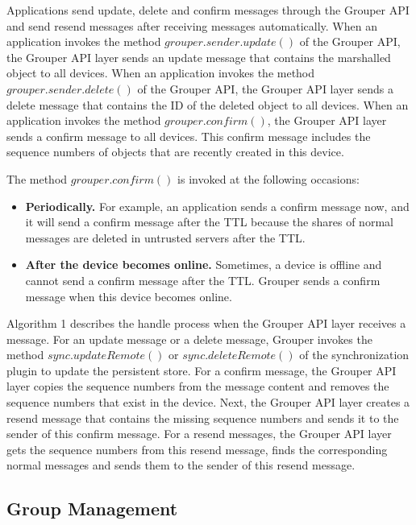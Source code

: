 \documentclass[twocolumn,10pt]{article}
\begin{document}
Applications send update, delete and confirm messages through the Grouper API and send resend messages after receiving messages automatically.
When an application invokes the method $grouper.sender.update()$ of the Grouper API, the Grouper API layer sends an update message that contains the marshalled object to all devices.
When an application invokes the method $grouper.sender.delete()$ of the Grouper API, the Grouper API layer sends a delete message that contains the ID of the deleted object to all devices. 
When an application invokes the method $grouper.confirm()$, the Grouper API layer sends a confirm message to all devices. 
This confirm message includes the sequence numbers of objects that are recently created in this device.

The method $grouper.confirm()$ is invoked at the following occasions:

\begin{itemize}
	\setlength{\itemsep}{1pt}
	\setlength{\parskip}{0pt}
	\setlength{\parsep}{0pt}
	\item \textbf{Periodically.}
	For example, an application sends a confirm message now, and it will send a confirm message after the TTL because the shares of normal messages are deleted in untrusted servers after the TTL.
	\item \textbf{After the device becomes online.} 
	Sometimes, a device is offline and cannot send a confirm message after the TTL.
	Grouper sends a confirm message when this device becomes online.
\end{itemize}

Algorithm 1 describes the handle process when the Grouper API layer receives a message.
For an update message or a delete message, Grouper invokes the method $sync.updateRemote()$ or $sync.deleteRemote()$ of the synchronization plugin to update the persistent store.
For a confirm message, the Grouper API layer copies the sequence numbers from the message content and removes the sequence numbers that exist in the device.
Next, the Grouper API layer creates a resend message that contains the missing sequence numbers and sends it to the sender of this confirm message.
For a resend messages, the Grouper API layer gets the sequence numbers from this resend message, finds the corresponding normal messages and sends them to the sender of this resend message.

\subsection{Group Management}
\end{document}
